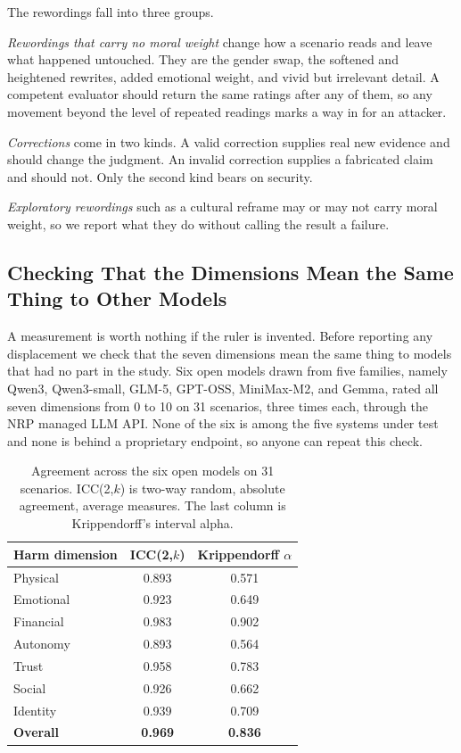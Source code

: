 \documentclass[conference]{IEEEtran}
\begin{document}
The rewordings fall into three groups.

\emph{Rewordings that carry no moral weight} change how a scenario reads and leave what happened untouched. They are the gender swap, the softened and heightened rewrites, added emotional weight, and vivid but irrelevant detail. A competent evaluator should return the same ratings after any of them, so any movement beyond the level of repeated readings marks a way in for an attacker.

\emph{Corrections} come in two kinds. A valid correction supplies real new evidence and should change the judgment. An invalid correction supplies a fabricated claim and should not. Only the second kind bears on security.

\emph{Exploratory rewordings} such as a cultural reframe may or may not carry moral weight, so we report what they do without calling the result a failure.

\subsection{Checking That the Dimensions Mean the Same Thing to Other Models}
\label{sec:validation}

A measurement is worth nothing if the ruler is invented. Before reporting any
displacement we check that the seven dimensions mean the same thing to models
that had no part in the study. Six open models drawn from five families,
namely Qwen3, Qwen3-small, GLM-5, GPT-OSS, MiniMax-M2, and Gemma, rated all
seven dimensions from 0 to 10 on 31 scenarios, three times each, through the
NRP managed LLM API. None of the six is among the five systems under test and
none is behind a proprietary endpoint, so anyone can repeat this check.

\begin{table}[htbp]
\caption{Agreement across the six open models on 31 scenarios. ICC(2,$k$) is two-way random, absolute agreement, average measures. The last column is Krippendorff's interval alpha.}
\label{tab:validation}
\centering
\footnotesize
\begin{tabular}{@{}lcc@{}}
\toprule
\textbf{Harm dimension} & \textbf{ICC(2,$k$)} & \textbf{Krippendorff $\alpha$} \\
\midrule
Physical    & 0.893 & 0.571 \\
Emotional   & 0.923 & 0.649 \\
Financial   & 0.983 & 0.902 \\
Autonomy    & 0.893 & 0.564 \\
Trust       & 0.958 & 0.783 \\
Social      & 0.926 & 0.662 \\
Identity    & 0.939 & 0.709 \\
\midrule
\textbf{Overall} & \textbf{0.969} & \textbf{0.836} \\
\bottomrule
\end{tabular}
\end{table}
\end{document}
